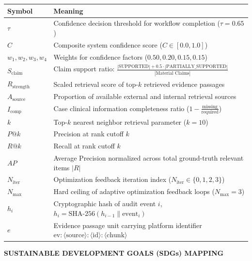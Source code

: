 \documentclass[12pt,a4paper]{report}
\begin{document}
\begin{table}[H]
\centering
\begin{tabularx}{\textwidth}{lX}
\toprule
\textbf{Symbol} & \textbf{Meaning} \\
\midrule
$\tau$ & Confidence decision threshold for workflow completion ($\tau = 0.65$) \\
$C$ & Composite system confidence score ($C \in [0.0, 1.0]$) \\
$w_1, w_2, w_3, w_4$ & Weights for confidence factors ($0.50, 0.20, 0.15, 0.15$) \\
$S_{\text{claim}}$ & Claim support ratio: $\frac{|\text{SUPPORTED}| + 0.5 \cdot |\text{PARTIALLY\_SUPPORTED}|}{|\text{Material Claims}|}$ \\
$R_{\text{strength}}$ & Scaled retrieval score of top-$k$ retrieved evidence passages \\
$A_{\text{source}}$ & Proportion of available external and internal retrieval sources \\
$I_{\text{comp}}$ & Case clinical information completeness ratio ($1 - \frac{\text{missing}}{\text{required}}$) \\
$k$ & Top-$k$ nearest neighbor retrieval parameter ($k=10$) \\
$P@k$ & Precision at rank cutoff $k$ \\
$R@k$ & Recall at rank cutoff $k$ \\
$AP$ & Average Precision normalized across total ground-truth relevant items $|R|$ \\
$N_{\text{iter}}$ & Optimization feedback iteration index ($N_{\text{iter}} \in \{0, 1, 2, 3\}$) \\
$N_{\text{max}}$ & Hard ceiling of adaptive optimization feedback loops ($N_{\text{max}} = 3$) \\
$h_i$ & Cryptographic hash of audit event $i$, $h_i = \text{SHA-256}(h_{i-1} \parallel \text{event}_i)$ \\
$e$ & Evidence passage unit carrying platform identifier $\text{ev}:\langle\text{source}\rangle:\langle\text{id}\rangle:\langle\text{chunk}\rangle$ \\
\bottomrule
\end{tabularx}
\end{table}

\newpage
\begin{center}
    \textbf{\Large SUSTAINABLE DEVELOPMENT GOALS (SDGs) MAPPING}\\[0.8cm]
\end{center}
\end{document}
